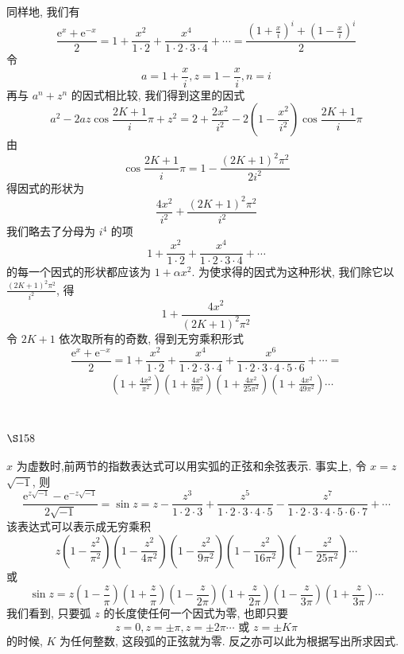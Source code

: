 同样地, 我们有
\[
\frac{\mathrm{e}^{x}+\mathrm{e}^{-x}}{2}=1+\frac{x^{2}}{1 \cdot 2}+\frac{x^{4}}{1 \cdot 2 \cdot 3 \cdot 4}+\cdots=\frac{\left(1+\frac{x}{i}\right)^{i}+\left(1-\frac{x}{i}\right)^{i}}{2}
\]
令
\[
a=1+\frac{x}{i}, z=1-\frac{x}{i}, n=i
\]
再与 $a^{n}+z^{n}$ 的因式相比较, 我们得到这里的因式
\[
a^{2}-2 a z \cos \frac{2 K+1}{i} \pi+z^{2}=2+\frac{2 x^{2}}{i^{2}}-2\left(1-\frac{x^{2}}{i^{2}}\right) \cos \frac{2 K+1}{i} \pi
\]
由
\[
\cos \frac{2 K+1}{i} \pi=1-\frac{(2 K+1)^{2} \pi^{2}}{2 i^{2}}
\]
得因式的形状为
\[
\frac{4 x^{2}}{i^{2}}+\frac{(2 K+1)^{2} \pi^{2}}{i^{2}}
\]
我们略去了分母为 $i^{4}$ 的项
\[
1+\frac{x^{2}}{1 \cdot 2}+\frac{x^{4}}{1 \cdot 2 \cdot 3 \cdot 4}+\cdots
\]
的每一个因式的形状都应该为 $1+\alpha x^{2}$. 为使求得的因式为这种形状, 我们除它以 $\frac{(2 K+1)^{2} \pi^{2}}{i^{2}}$, 得
\[
1+\frac{4 x^{2}}{(2 K+1)^{2} \pi^{2}}
\]
令 $2 K+1$ 依次取所有的奇数, 得到无穷乘积形式
\[
\frac{\mathrm{e}^{x}+\mathrm{e}^{-x}}{2}=1+\frac{x^{2}}{1 \cdot 2}+\frac{x^{4}}{1 \cdot 2 \cdot 3 \cdot 4}+\frac{x^{6}}{1 \cdot 2 \cdot 3 \cdot 4 \cdot 5 \cdot 6}+\cdots=
\]
\[
\begin{aligned}
& \qquad\left(1+\frac{4 x^{2}}{\pi^{2}}\right)\left(1+\frac{4 x^{2}}{9 \pi^{2}}\right)\left(1+\frac{4 x^{2}}{25 \pi^{2}}\right)\left(1+\frac{4 x^{2}}{49 \pi^{2}}\right) \cdots \\
& 
\end{aligned}
\]
\section{$\S 158$}
$x$ 为虚数时,前两节的指数表达式可以用实弧的正弦和余弦表示. 事实上, 令 $x=z$ $\sqrt{-1}$, 则
\[
\frac{\mathrm{e}^{z \sqrt{-1}}-\mathrm{e}^{-z \sqrt{-1}}}{2 \sqrt{-1}}=\sin z=z-\frac{z^{3}}{1 \cdot 2 \cdot 3}+\frac{z^{5}}{1 \cdot 2 \cdot 3 \cdot 4 \cdot 5}-\frac{z^{7}}{1 \cdot 2 \cdot 3 \cdot 4 \cdot 5 \cdot 6 \cdot 7}+\cdots
\]
该表达式可以表示成无穷乘积
\[
z\left(1-\frac{z^{2}}{\pi^{2}}\right)\left(1-\frac{z^{2}}{4 \pi^{2}}\right)\left(1-\frac{z^{2}}{9 \pi^{2}}\right)\left(1-\frac{z^{2}}{16 \pi^{2}}\right)\left(1-\frac{z^{2}}{25 \pi^{2}}\right) \cdots
\]
或
\[
\sin z=z\left(1-\frac{z}{\pi}\right)\left(1+\frac{z}{\pi}\right)\left(1-\frac{z}{2 \pi}\right)\left(1+\frac{z}{2 \pi}\right)\left(1-\frac{z}{3 \pi}\right)\left(1+\frac{z}{3 \pi}\right) \cdots
\]
我们看到, 只要弧 $z$ 的长度使任何一个因式为零, 也即只要
\[
z=0, z=\pm \pi, z=\pm 2 \pi \cdots \text { 或 } z=\pm K \pi
\]
的时候, $K$ 为任何整数, 这段弧的正弦就为零. 反之亦可以此为根据写出所求因式.

